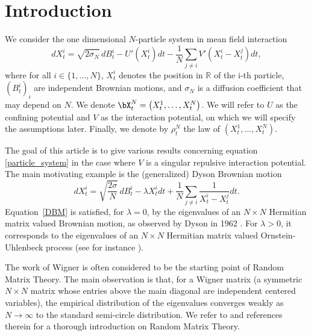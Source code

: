 \Changel

\section{Introduction}

We consider the one dimensional $N$-particle system in mean field interaction\vspace*{-3pt}
\begin{equation}\label{particle_system}
dX^i_t=\sqrt{2\sigma_N}\,dB^i_t-U'\left(X^i_t\right)dt-\frac{1}{N}\sum_{j\neq i}V'(X^i_t-X^j_t)dt,
\end{equation}
where for all $i\in\{1,\dots,N\}$, $X^i_t$ denotes the position in $\mathbb{R}$ of the i-th particle, $(B^i_t)_i$ are independent Brownian motions, and $\sigma_N$ is a diffusion coefficient that may depend on $N$. We denote $\bX^N_t=\left(X^1_t,\dots,X^N_t\right)$. We will refer to $U$ as the confining potential and $V$ as the interaction potential, on which we will specify the assumptions later. Finally, we denote by $\rho^N_t$ the law of $(X^1_t,\dots,X^N_t)$.

The goal of this article is to give various results concerning equation \eqref{particle_system} in the case where $V$ is a singular repulsive interaction potential. The main motivating example is the (generalized) Dyson Brownian motion\vspace*{-3pt}
\begin{equation}\label{DBM}
dX^i_t=\sqrt{\frac{2\sigma}{N}}\,dB^i_t-\lambda X^i_tdt+\frac{1}{N}\sum_{j\neq i}\frac{1}{X^i_t-X^j_t}dt.
\end{equation}
Equation~\eqref{DBM} is satisfied, for $\lambda=0$, by the eigenvalues of an $N\times N$ Hermitian matrix valued Brownian motion, as observed by Dyson in 1962 \cite{Dyson}. For $\lambda>0$, it corresponds to the eigenvalues of an $N\times N$ Hermitian matrix valued Ornstein-Uhlenbeck process (see for instance \cite{Chan92, Rogers_Shi}).

The work of Wigner \cite{Wigner} is often considered to be the starting point of Random Matrix Theory. The main observation is that, for a Wigner matrix (a symmetric $N\times N$ matrix whose entries above the main diagonal are independent centered variables), the empirical distribution of the eigenvalues converges weakly as $N\to\infty$ to the standard semi-circle distribution. We refer to \cite{anderson_guionnet_zeitouni_2009} and references therein for a thorough introduction on Random Matrix Theory.

